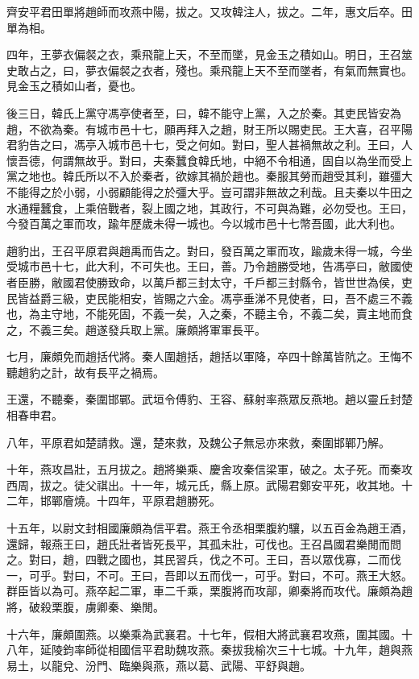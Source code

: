 齊安平君田單將趙師而攻燕中陽，拔之。又攻韓注人，拔之。二年，惠文后卒。田單為相。

四年，王夢衣偏裻之衣，乘飛龍上天，不至而墜，見金玉之積如山。明日，王召筮史敢占之，曰，夢衣偏裻之衣者，殘也。乘飛龍上天不至而墜者，有氣而無實也。見金玉之積如山者，憂也。

後三日，韓氏上黨守馮亭使者至，曰，韓不能守上黨，入之於秦。其吏民皆安為趙，不欲為秦。有城市邑十七，願再拜入之趙，財王所以賜吏民。王大喜，召平陽君豹告之曰，馮亭入城市邑十七，受之何如。對曰，聖人甚禍無故之利。王曰，人懷吾德，何謂無故乎。對曰，夫秦蠶食韓氏地，中絕不令相通，固自以為坐而受上黨之地也。韓氏所以不入於秦者，欲嫁其禍於趙也。秦服其勞而趙受其利，雖彊大不能得之於小弱，小弱顧能得之於彊大乎。豈可謂非無故之利哉。且夫秦以牛田之水通糧蠶食，上乘倍戰者，裂上國之地，其政行，不可與為難，必勿受也。王曰，今發百萬之軍而攻，踰年歷歲未得一城也。今以城市邑十七幣吾國，此大利也。

趙豹出，王召平原君與趙禹而告之。對曰，發百萬之軍而攻，踰歲未得一城，今坐受城市邑十七，此大利，不可失也。王曰，善。乃令趙勝受地，告馮亭曰，敝國使者臣勝，敝國君使勝致命，以萬戶都三封太守，千戶都三封縣令，皆世世為侯，吏民皆益爵三級，吏民能相安，皆賜之六金。馮亭垂涕不見使者，曰，吾不處三不義也，為主守地，不能死固，不義一矣，入之秦，不聽主令，不義二矣，賣主地而食之，不義三矣。趙遂發兵取上黨。廉頗將軍軍長平。

七月，廉頗免而趙括代將。秦人圍趙括，趙括以軍降，卒四十餘萬皆阬之。王悔不聽趙豹之計，故有長平之禍焉。

王還，不聽秦，秦圍邯鄲。武垣令傅豹、王容、蘇射率燕眾反燕地。趙以靈丘封楚相春申君。

八年，平原君如楚請救。還，楚來救，及魏公子無忌亦來救，秦圍邯鄲乃解。

十年，燕攻昌壯，五月拔之。趙將樂乘、慶舍攻秦信梁軍，破之。太子死。而秦攻西周，拔之。徒父祺出。十一年，城元氏，縣上原。武陽君鄭安平死，收其地。十二年，邯鄲廥燒。十四年，平原君趙勝死。

十五年，以尉文封相國廉頗為信平君。燕王令丞相栗腹約驤，以五百金為趙王酒，還歸，報燕王曰，趙氏壯者皆死長平，其孤未壯，可伐也。王召昌國君樂閒而問之。對曰，趙，四戰之國也，其民習兵，伐之不可。王曰，吾以眾伐寡，二而伐一，可乎。對曰，不可。王曰，吾即以五而伐一，可乎。對曰，不可。燕王大怒。群臣皆以為可。燕卒起二軍，車二千乘，栗腹將而攻鄗，卿秦將而攻代。廉頗為趙將，破殺栗腹，虜卿秦、樂閒。

十六年，廉頗圍燕。以樂乘為武襄君。十七年，假相大將武襄君攻燕，圍其國。十八年，延陵鈞率師從相國信平君助魏攻燕。秦拔我榆次三十七城。十九年，趙與燕易土，以龍兌、汾門、臨樂與燕，燕以葛、武陽、平舒與趙。

